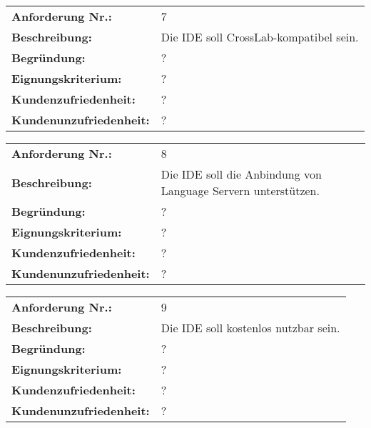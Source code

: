 \begin{tabularx}{\textwidth}{|lX|}
    \hline
    \textbf{Anforderung Nr.:}     & 7                                      \\
    \textbf{Beschreibung:}        & Die IDE soll CrossLab-kompatibel sein. \\
    \textbf{Begründung:}          & ?                                      \\
    \textbf{Eignungskriterium:}   & ?                                      \\
    \textbf{Kundenzufriedenheit:} & ?                                      \\ \textbf{Kundenunzufriedenheit:} & ? \\
    \hline
\end{tabularx}

\begin{tabularx}{\textwidth}{|lX|}
    \hline
    \textbf{Anforderung Nr.:}     & 8                                                             \\
    \textbf{Beschreibung:}        & Die IDE soll die Anbindung von Language Servern unterstützen. \\
    \textbf{Begründung:}          & ?                                                             \\
    \textbf{Eignungskriterium:}   & ?                                                             \\
    \textbf{Kundenzufriedenheit:} & ?                                                             \\ \textbf{Kundenunzufriedenheit:} & ? \\
    \hline
\end{tabularx}

\begin{tabularx}{\textwidth}{|lX|}
    \hline
    \textbf{Anforderung Nr.:}     & 9                                    \\
    \textbf{Beschreibung:}        & Die IDE soll kostenlos nutzbar sein. \\
    \textbf{Begründung:}          & ?                                    \\
    \textbf{Eignungskriterium:}   & ?                                    \\
    \textbf{Kundenzufriedenheit:} & ?                                    \\ \textbf{Kundenunzufriedenheit:} & ? \\
    \hline
\end{tabularx}

